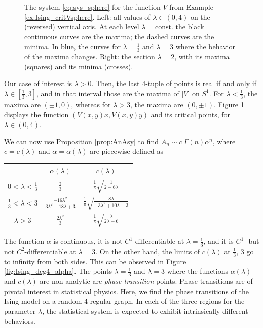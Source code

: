 \documentclass[english]{ourlematemasingle}
\numberwithin{theorem}{section}
\theoremstyle{remark}
\newenvironment{example}
{\pushQED{\qed}\renewcommand{\qedsymbol}{$\diamond$}\examplex}
{\popQED\endexamplex}
\begin{document}
\begin{example}
\begin{figure}[ht]
        \caption{The system \eqref{eq:sys_sphere} for the function $V$ from Example \ref{ex:Ising_critVsphere}. Left: all values of $\lambda \in (0,4)$ on the (reversed) vertical axis. At each level $\lambda=\text{const.}$ the black continuous curves are the maxima; the dashed curves are the minima. In blue, the curves for $\lambda=\frac{1}{3}$ and $\lambda=3$ where the behavior of the maxima changes.
        Right: the section $\lambda=2$, with its maxima (squares) and its minima (crosses).
        }
        \label{fig:sing_various_lambdas_3D}
    \end{figure}
Our case of interest is $\lambda >0$. Then, the last $4$-tuple of points is real if and only if $\lambda\in [\frac{1}{3}, 3]$, and in that interval those are the maxima of $|V|$ on $S^1$. For $\lambda<\frac{1}{3}$, the maxima are $(\pm 1, 0)$, whereas for $\lambda>3$, the maxima are $(0,\pm 1)$. Figure \ref{fig:sing_various_lambdas_3D} displays the function $(V(x,y) x, V(x,y) y)$ and its critical points, for $\lambda\in (0,4)$.

We can now use Proposition \ref{prop:AnAsy} to find
$A_n \sim c \:\Gamma(n) \alpha^n$,
where $c = c(\lambda)$ and $\alpha = \alpha(\lambda)$ are piecewise defined as
\begin{center}
    {\def\arraystretch{1.8}
    \begin{tabular}{c|c|c}
         & $\alpha(\lambda)$ & $c(\lambda)$ \\
        \hline
       $0<\lambda<\tfrac{1}{3}$  & $\frac{2}{3}$ & $\frac{1}{\pi} \sqrt{\frac{1}{2-6\lambda}}$ \\
       $\tfrac{1}{3}<\lambda<3$  & $\frac{-16\lambda^2}{3\lambda^2-18\lambda+3}$ & $\frac{1}{\pi} \sqrt{\frac{8\lambda}{-3\lambda^2+10\lambda -3}}$ \\
       $\lambda>3$  & $\frac{2\lambda^2}{3}$ & $\frac{1}{\pi} \sqrt{\frac{\lambda}{2\lambda -6}}$ \\
    \end{tabular}
    }
\end{center}
The function $\alpha$ is continuous, it is not $C^1$-differentiable at $\lambda=\frac{1}{3}$, and it is $C^1$- but not $C^2$-differentiable at $\lambda=3$. On the other hand, the limits of $c(\lambda)$ at $\frac{1}{3}$, $3$ go to infinity from both sides.
This can be observed in Figure \ref{fig:Ising_deg4_alpha}.
The points $\lambda=\frac13$ and $\lambda=3$ where the functions $\alpha(\lambda)$ and $c(\lambda)$ are non-analytic 
are \emph{phase transition} points.
Phase transitions are of pivotal interest in statistical physics. Here, we find the phase transitions of the Ising model on a random 4-regular graph. In each of the three regions for the parameter $\lambda$, the statistical system is expected to exhibit intrinsically different behaviors.


\end{example}
\end{document}
